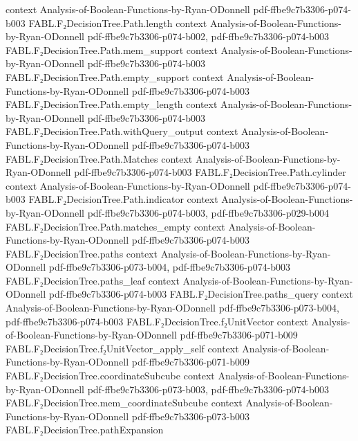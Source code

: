 \begin{theorem}
  {context}
  {Analysis-of-Boolean-Functions-by-Ryan-ODonnell}
  {pdf-ffbe9c7b3306-p074-b003}
\proofstep
  {FABL.F₂DecisionTree.Path.length}
  {context}
  {Analysis-of-Boolean-Functions-by-Ryan-ODonnell}
  {pdf-ffbe9c7b3306-p074-b002,
    pdf-ffbe9c7b3306-p074-b003}
\proofstep
  {FABL.F₂DecisionTree.Path.mem_support}
  {context}
  {Analysis-of-Boolean-Functions-by-Ryan-ODonnell}
  {pdf-ffbe9c7b3306-p074-b003}
\proofstep
  {FABL.F₂DecisionTree.Path.empty_support}
  {context}
  {Analysis-of-Boolean-Functions-by-Ryan-ODonnell}
  {pdf-ffbe9c7b3306-p074-b003}
\proofstep
  {FABL.F₂DecisionTree.Path.empty_length}
  {context}
  {Analysis-of-Boolean-Functions-by-Ryan-ODonnell}
  {pdf-ffbe9c7b3306-p074-b003}
\proofstep
  {FABL.F₂DecisionTree.Path.withQuery_output}
  {context}
  {Analysis-of-Boolean-Functions-by-Ryan-ODonnell}
  {pdf-ffbe9c7b3306-p074-b003}
\proofstep
  {FABL.F₂DecisionTree.Path.Matches}
  {context}
  {Analysis-of-Boolean-Functions-by-Ryan-ODonnell}
  {pdf-ffbe9c7b3306-p074-b003}
\proofstep
  {FABL.F₂DecisionTree.Path.cylinder}
  {context}
  {Analysis-of-Boolean-Functions-by-Ryan-ODonnell}
  {pdf-ffbe9c7b3306-p074-b003}
\proofstep
  {FABL.F₂DecisionTree.Path.indicator}
  {context}
  {Analysis-of-Boolean-Functions-by-Ryan-ODonnell}
  {pdf-ffbe9c7b3306-p074-b003,
    pdf-ffbe9c7b3306-p029-b004}
\proofstep
  {FABL.F₂DecisionTree.Path.matches_empty}
  {context}
  {Analysis-of-Boolean-Functions-by-Ryan-ODonnell}
  {pdf-ffbe9c7b3306-p074-b003}
\proofstep
  {FABL.F₂DecisionTree.paths}
  {context}
  {Analysis-of-Boolean-Functions-by-Ryan-ODonnell}
  {pdf-ffbe9c7b3306-p073-b004,
    pdf-ffbe9c7b3306-p074-b003}
\proofstep
  {FABL.F₂DecisionTree.paths_leaf}
  {context}
  {Analysis-of-Boolean-Functions-by-Ryan-ODonnell}
  {pdf-ffbe9c7b3306-p074-b003}
\proofstep
  {FABL.F₂DecisionTree.paths_query}
  {context}
  {Analysis-of-Boolean-Functions-by-Ryan-ODonnell}
  {pdf-ffbe9c7b3306-p073-b004,
    pdf-ffbe9c7b3306-p074-b003}
\proofstep
  {FABL.F₂DecisionTree.f₂UnitVector}
  {context}
  {Analysis-of-Boolean-Functions-by-Ryan-ODonnell}
  {pdf-ffbe9c7b3306-p071-b009}
\proofstep
  {FABL.F₂DecisionTree.f₂UnitVector_apply_self}
  {context}
  {Analysis-of-Boolean-Functions-by-Ryan-ODonnell}
  {pdf-ffbe9c7b3306-p071-b009}
\proofstep
  {FABL.F₂DecisionTree.coordinateSubcube}
  {context}
  {Analysis-of-Boolean-Functions-by-Ryan-ODonnell}
  {pdf-ffbe9c7b3306-p073-b003,
    pdf-ffbe9c7b3306-p074-b003}
\proofstep
  {FABL.F₂DecisionTree.mem_coordinateSubcube}
  {context}
  {Analysis-of-Boolean-Functions-by-Ryan-ODonnell}
  {pdf-ffbe9c7b3306-p073-b003}
\proofstep
  {FABL.F₂DecisionTree.pathExpansion}

\end{theorem}
